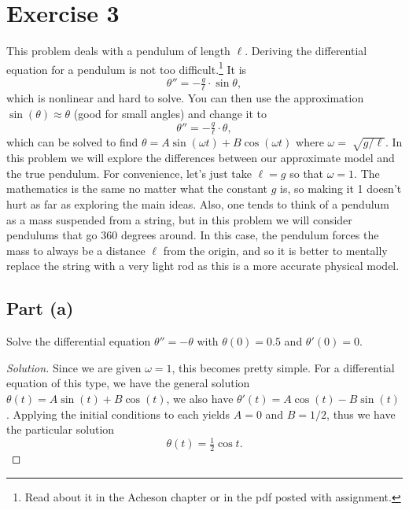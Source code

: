 \documentclass[letterpaper, 12pt]{amsart}
\theoremstyle{definition}  							%
\begin{document}
	\section*{Exercise 3}
	This problem deals with a pendulum of length $\ell$. 
	Deriving the differential equation for a pendulum is not too difficult.\footnote{Read about it in the Acheson chapter or in the pdf posted with assignment.}
	It is $$\theta'' = -\tfrac{g}{\ell} \cdot \sin\theta,$$ which is nonlinear and hard to solve. 
	You can then use the approximation $\sin(\theta) \approx \theta$ (good for small angles) and change it to $$\theta'' = -\tfrac{g}{\ell} \cdot \theta,$$ which can be solved to find $\theta = A \sin(\omega t) + B \cos(\omega t)$ where $\omega = 􏰃\sqrt{g/\ell}$. 
	In this problem we will explore the differences between our approximate model and the true pendulum. 
	For convenience, let’s just take $\ell = g$ so that $\omega = 1$. 
	The mathematics is the same no matter what the constant $g$ is, so making it 1 doesn’t hurt as far as exploring the main ideas.
	Also, one tends to think of a pendulum as a mass suspended from a string, but in this problem we will consider pendulums that go 360 degrees around. 
	In this case, the pendulum forces the mass to always be a distance $\ell$ from the origin, and so it is better to mentally replace the string with a very light rod as this is a more accurate physical model.

		\subsection*{Part (a)}
		Solve the differential equation $\theta'' = -\theta$ with $\theta(0) = 0.5$ and $\theta'(0) = 0$.

		\begin{proof}[Solution]
		Since we are given $\omega = 1$, this becomes pretty simple.
		For a differential equation of this type, we have the general solution $\theta(t) = A \sin(t) + B \cos(t)$, we also have $\theta'(t) = A \cos(t) - B \sin(t)$.
		Applying the initial conditions to each yields $A = 0$ and $B = 1/2$, thus we have the particular solution $$\theta(t) = \tfrac{1}{2}\cos{t}.$$
		\end{proof}
\end{document}
